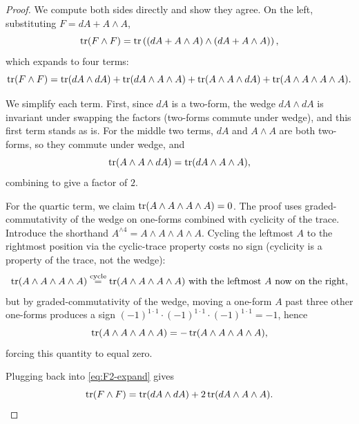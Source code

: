 \begin{proof}
We compute both sides directly and show they agree. On the left, substituting $F = dA + A\wedge A$,
\begin{equation*}
\operatorname{tr}(F\wedge F) = \operatorname{tr}\left((dA + A\wedge A)\wedge(dA + A\wedge A)\right),
\end{equation*}
which expands to four terms:
\begin{equation}\label{eq:F2-expand}
\operatorname{tr}(F\wedge F) = \operatorname{tr}(dA \wedge dA) + \operatorname{tr}(dA \wedge A\wedge A) + \operatorname{tr}(A\wedge A\wedge dA) + \operatorname{tr}(A\wedge A\wedge A\wedge A).
\end{equation}

\medskip

\noindent We simplify each term. First, since $dA$ is a two-form, the wedge $dA\wedge dA$ is invariant under swapping the factors (two-forms commute under wedge), and this first term stands as is. For the middle two terms, $dA$ and $A\wedge A$ are both two-forms, so they commute under wedge, and
\begin{equation*}
\operatorname{tr}(A\wedge A \wedge dA) = \operatorname{tr}(dA \wedge A\wedge A),
\end{equation*}
combining to give a factor of $2$.

\medskip

\noindent For the quartic term, we claim $\operatorname{tr}(A\wedge A\wedge A\wedge A) = 0$. The proof uses graded-commutativity of the wedge on one-forms combined with cyclicity of the trace. Introduce the shorthand $A^{\wedge 4} = A\wedge A\wedge A\wedge A$. Cycling the leftmost $A$ to the rightmost position via the cyclic-trace property costs no sign (cyclicity is a property of the trace, not the wedge):
\begin{equation*}
\operatorname{tr}(A\wedge A\wedge A\wedge A) \stackrel{\text{cycle}}{=} \operatorname{tr}(A\wedge A\wedge A\wedge A) \text{ with the leftmost $A$ now on the right,}
\end{equation*}
but by graded-commutativity of the wedge, moving a one-form $A$ past three other one-forms produces a sign $(-1)^{1\cdot 1}\cdot (-1)^{1\cdot 1}\cdot (-1)^{1\cdot 1} = -1$, hence
\begin{equation*}
\operatorname{tr}(A\wedge A\wedge A\wedge A) = -\operatorname{tr}(A\wedge A\wedge A\wedge A),
\end{equation*}
forcing this quantity to equal zero.

\medskip

\noindent Plugging back into \eqref{eq:F2-expand} gives
\begin{equation}\label{eq:F2-final}
\operatorname{tr}(F\wedge F) = \operatorname{tr}(dA \wedge dA) + 2\operatorname{tr}(dA\wedge A\wedge A).
\end{equation}


\end{proof}
